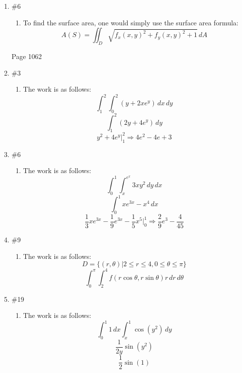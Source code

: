 \documentclass[12pt]{article}
\begin{document}
\begin{enumerate}
  \item \#6 \begin{enumerate}

      \item To find the surface area, one would simply use the surface area formula:
        $$A(S)=\iint_D\sqrt{f_x(x,y)^2+f_y(x,y)^2 + 1}\,dA$$

    \end{enumerate}

    \begin{center}

Page 1062

    \end{center}

    \item \#3

    \begin{enumerate}

      \item The work is as follows:
        $$\int_1^2\int_0^2 (y+2xe^y)\,dx\,dy$$
        $$\int_1^2(2y+4e^y)\,dy$$
        $$y^2+4e^y\Big|_1^2\Longrightarrow 4e^2-4e+3$$
    \end{enumerate}


    \item \#6 \begin{enumerate}

        \item The work is as follows:
          $$\int_0^1\int_x^{e^x}3xy^2\,dy\,dx$$
          $$\int_0^1 xe^{3x}-x^4\,dx$$
          $$\frac{1}{3}xe^{3x}-\frac{1}{9}e^{3x}-\frac{1}{5}x^5\Big|_0^1 \Longrightarrow \frac{2}{9}e^3-\frac{4}{45}$$

\end{enumerate}

    \item \#9 \begin{enumerate}

        \item The work is as follows:
          $$D=\{(r,\theta)|2\leq r\leq 4, 0\leq \theta\leq \pi\}$$
          $$\int_0^{\pi}\int_2^4f(r\cos\theta,r\sin\theta)r\,dr\,d\theta$$


    \end{enumerate}

  \item \#19 \begin{enumerate}

      \item The work is as follows:
        $$\int_0^1 1\,dx\int_x^1 \cos(y^2)\,dy$$
        $$\frac{1}{2y}\sin(y^2)$$
        $$\frac{1}{2}\sin(1)$$


\end{enumerate}
\end{enumerate}
\end{document}
